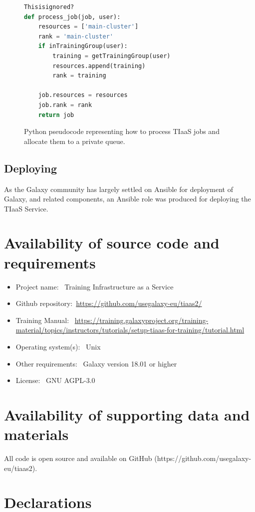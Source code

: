 \documentclass[a4paper,num-refs]{oup-contemporary}
\begin{document}
\begin{figure}[!ht]
\centering
\begin{lstlisting}[frame=single,language=Python]  % Start your code-block
Thisisignored?
def process_job(job, user):
    resources = ['main-cluster']
    rank = 'main-cluster'
    if inTrainingGroup(user):
        training = getTrainingGroup(user)
        resources.append(training)
        rank = training

    job.resources = resources
    job.rank = rank
    return job
\end{lstlisting}
\caption{Python pseudocode representing how to process TIaaS jobs and allocate them to a private queue.\label{code:scheduler}}
\end{figure}

\subsection{Deploying}
As the Galaxy community has largely settled on Ansible for deployment of Galaxy, and related components, an Ansible role was produced for deploying the TIaaS Service.

\section{Availability of source code and requirements}

\begin{itemize}
\item Project name: ~Training Infrastructure as a Service
\item Github repository:~\url{https://github.com/usegalaxy-eu/tiaas2/}
\item Training Manual: ~\url{https://training.galaxyproject.org/training-material/topics/instructors/tutorials/setup-tiaas-for-training/tutorial.html}
\item Operating system(s): ~Unix
\item Other requirements: ~Galaxy version 18.01 or higher
\item License: ~GNU AGPL-3.0
\end{itemize}

\section{Availability of supporting data and materials}
All code is open source and available on GitHub (https://github.com/usegalaxy-eu/tiaas2).

\section{Declarations}
\end{document}
